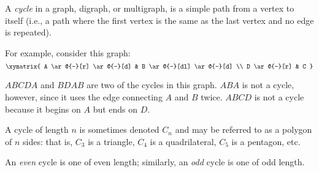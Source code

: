 \documentclass[12pt]{article}
\begin{document}
A \emph{cycle} in a graph, digraph, or multigraph, is a simple path from a vertex to itself (i.e., a path where the first vertex is the same as the last vertex and no edge is repeated).

For example, consider this graph:
$$\xymatrix{
A \ar@{-}[r] \ar@{-}[d] & B \ar@{-}[dl] \ar@{-}[d] \\
D \ar@{-}[r] & C
}$$

$ABCDA$ and $BDAB$ are two of the cycles in this graph.  $ABA$ is not a cycle, however, since it uses the edge connecting $A$ and $B$ twice.  $ABCD$ is not a cycle because it begins on $A$ but ends on $D$.

A cycle of length $n$ is sometimes denoted $C_n$ and may be referred to as a polygon of $n$ sides: that is, $C_3$ is a triangle, $C_4$ is a quadrilateral, $C_5$ is a pentagon, etc.

An \emph{even} cycle is one of even length; similarly, an \emph{odd} cycle is one of odd length.
\end{document}

